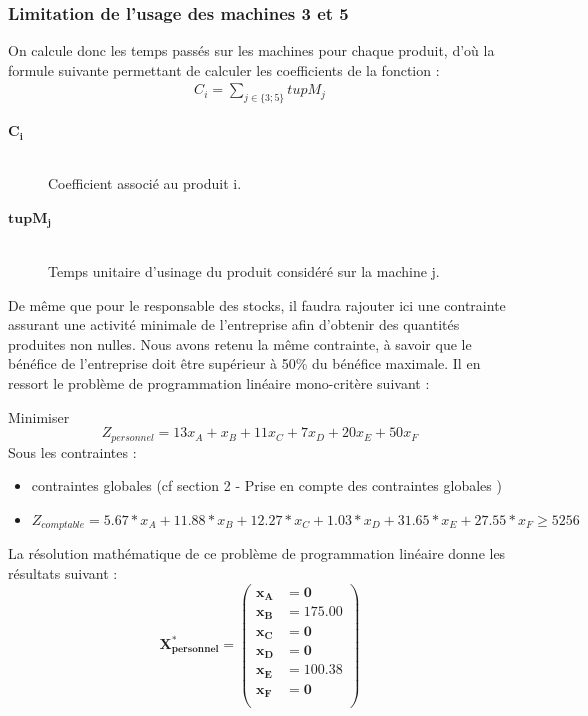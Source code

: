 \documentclass[12pt]{article}
\begin{document}
\subsubsection{Limitation de l'usage des machines 3 et 5} 
On calcule donc les temps passés sur les machines pour chaque produit, d'où la formule suivante permettant de calculer les coefficients de la fonction : 
\begin{align*} 
 C_{i} = \sum_{j\in\lbrace3;5\rbrace}tupM_{j} 
 \end{align*} 
\begin{description}
\item[$\boldsymbol{C_{i}}$] \hfill\\Coefficient associé au produit i.
\item[$\boldsymbol{tupM_{j}}$]\hfill\\ Temps unitaire d'usinage du produit considéré sur la machine j.
\end{description}
De même que pour le responsable des stocks, il faudra rajouter ici une contrainte assurant une  activité minimale de l'entreprise afin d'obtenir des quantités produites non nulles. Nous avons retenu la même contrainte, à savoir que le bénéfice de l'entreprise doit être supérieur à 50\% du bénéfice maximale.
Il en ressort le problème de programmation linéaire mono-critère suivant :
\begin{tcolorbox}
Minimiser
\begin{equation*}
 Z_{personnel}= 13x_{A} + x_{B} + 11x_{C} + 7x_{D} + 20x_{E} + 50x_{F}
\end{equation*}
Sous les contraintes :
\begin{itemize}
\item contraintes globales (cf section 2 - Prise en compte des contraintes globales )
\item $ Z_{comptable}= 5.67*x_{A} +11.88*x_{B} +12.27*x_{C} +1.03*x_{D} +31.65*x_{E} +27.55*x_{F} \geq 5256$
\end{itemize}
\end{tcolorbox}
La résolution mathématique de ce problème de programmation linéaire donne les résultats suivant :\\
\begin{equation*}
\boldsymbol{X^{*}_{personnel} = 
   \left (
   \begin{aligned}
      x_{A} &= 0 \\
      x_{B} &= 175.00 \\
      x_{C} &= 0 \\
      x_{D} &= 0 \\
      x_{E} &= 100.38 \\ 
      x_{F} &= 0 \\
   \end{aligned}
   \right )
 } 
\end{equation*}
\end{document}
